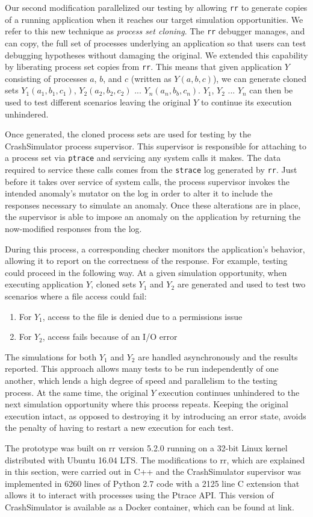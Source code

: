 Our second modification parallelized our testing
by allowing {\tt rr} to generate copies of a running application when
it reaches our target simulation opportunities.
We refer to this new technique as {\it process set cloning}.
The {\tt rr}
debugger manages, and can copy, the full set of processes underlying an
application so that users can test debugging hypotheses without damaging
the original.  We extended this capability by liberating process
set copies from {\tt rr}.  This means that given application $Y$ consisting
of processes $a$, $b$, and $c$ (written as $Y(a, b, c)$), we can generate
cloned sets $Y_1(a_1, b_1, c_1)$, $Y_2(a_2, b_2, c_2)$ ... $Y_n(a_n, b_b,
c_n)$.  $Y_1$, $Y_2$ ... $Y_n$ can then be used to test different scenarios
leaving the original $Y$ to continue its execution unhindered.

Once generated, the cloned process sets are used
for testing by the CrashSimulator process supervisor.
This supervisor is responsible for attaching to a process set
via {\tt ptrace} and
servicing any system calls it makes.
The data required to service these calls
comes from the  {\tt strace} log
generated by {\tt rr}.
Just before it takes over service of system calls,
the process supervisor invokes the intended anomaly's mutator
on the log in order to alter it to include the responses
necessary to simulate an anomaly.
Once these alterations are in place,
the supervisor is able to impose an anomaly
on the application by returning the now-modified responses from the log.

During this process,
a corresponding checker
monitors the application's behavior,
allowing it to report on the correctness of the response.
For example, testing could proceed in the following way.
At a given simulation opportunity, when executing application $Y$,
cloned sets $Y_1$ and $Y_2$ are generated and
used to test two scenarios where a file access could fail:
\begin{enumerate}
    \item{For $Y_1$, access to the file is denied due to a permissions issue}
    \item{For $Y_2$, access fails because of an I/O error}
\end{enumerate}
The simulations for both $Y_1$ and $Y_2$ are handled asynchronously and
the results reported.
This approach allows many tests to be run independently of one another,
which lends a
high degree of speed and
parallelism to the testing process.
At the same time, the original $Y$ execution continues unhindered to the
next simulation opportunity where this process repeats.
Keeping the original execution intact,
as opposed to destroying it by introducing an error state,
avoids the penalty
of having to restart a new execution for each test.

The prototype was built on rr version 5.2.0 running on a 32-bit Linux kernel
distributed with Ubuntu 16.04 LTS.  The modifications to rr, which are
explained in this section, were carried out in C++ and the CrashSimulator
supervisor was implemented in 6260 lines of Python 2.7 code with a 2125
line C extension that allows it to interact with processes using the Ptrace
API.
This version of CrashSimulator is available as a Docker container, which can be found at link.
